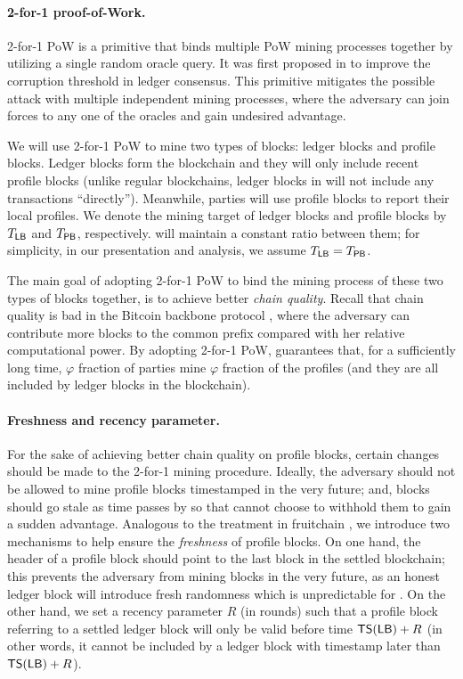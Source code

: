 \paragraph{2-for-1 proof-of-Work.}
%
2-for-1 PoW is a primitive that binds multiple PoW mining processes together by utilizing a single random oracle query.
%
It was first proposed in \cite{EC:GarKiaLeo15} to improve the corruption threshold in ledger consensus.
%
This primitive mitigates the possible attack with multiple independent mining processes, where the adversary can join forces to any one of the oracles and gain undesired advantage.

We will use 2-for-1 PoW to mine two types of blocks: ledger blocks and profile blocks.
%
Ledger blocks form the \Taxis blockchain and they will only include recent profile blocks (unlike regular blockchains, ledger blocks in \Taxis will not include any transactions ``directly'').
%
Meanwhile, parties will use profile blocks to report their local profiles.
%
We denote the mining target of ledger blocks and profile blocks by $T_\mathsf{LB}$ and $T_\mathsf{PB}$, respectively.
%
\Taxis will maintain a constant ratio between them; for simplicity, in our presentation and analysis, we assume $T_\mathsf{LB} = T_\mathsf{PB}$.

The main goal of adopting 2-for-1 PoW to bind the mining process of these two types of blocks together, is to achieve better \emph{chain quality}.
%
Recall that chain quality is bad in the Bitcoin backbone protocol \cite{EC:GarKiaLeo15,C:GarKiaLeo17}, where the adversary can contribute more blocks to the common prefix compared with her relative computational power.
%
By adopting 2-for-1 PoW, \Taxis guarantees that, for a sufficiently long time, $\varphi$ fraction of parties mine $\varphi$ fraction of the profiles (and they are all included by ledger blocks in the blockchain).

\paragraph{Freshness and recency parameter.}
%
For the sake of achieving better chain quality on profile blocks, certain changes should be made to the 2-for-1 mining procedure.
%
Ideally, the adversary \adv should not be allowed to mine profile blocks timestamped in the very future; and, blocks should go stale as time passes by so that \adv cannot choose to withhold them to gain a sudden advantage.
%
Analogous to the treatment in fruitchain \cite{PODC:PasShi17}, we introduce two mechanisms to help ensure the \emph{freshness} of profile blocks.
%
On one hand, the header of a profile block should point to the last block in the settled blockchain; this prevents the adversary from mining blocks in the very future, as an honest ledger block will introduce fresh randomness which is unpredictable for \adv.
%
On the other hand, we set a recency parameter $R$ (in rounds) such that a profile block \PB referring to a settled ledger block \LB will only be valid before time $\mathsf{TS}(\mathsf{LB}) + R$ (in other words, it cannot be included by a ledger block with timestamp later than $\mathsf{TS}(\mathsf{LB}) + R$).




